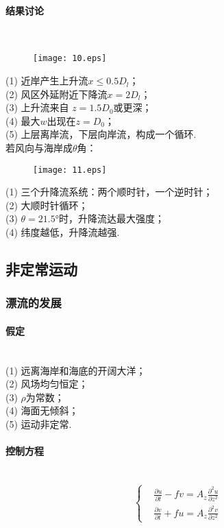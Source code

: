 \documentclass[a4paper,12pt]{article}
\begin{document}
    \paragraph{结果讨论}~{}
    \begin{figure}[H]
        \centering\texttt{[image: 10.eps]}
        \caption*{}
    \end{figure}
    (1) 近岸产生上升流$x\leq 0.5D_l$；\\
    (2) 风区外延附近下降流$x=2D_l$；\\
    (3) 上升流来自 $z=1.5D_0$或更深；\\
    (4) 最大$w$出现在$z=D_0$；\\
    (5) 上层离岸流，下层向岸流，构成一个循环.\\
    若风向与海岸成$\theta$角：\\
    \begin{figure}[H]
        \centering\texttt{[image: 11.eps]}
        \caption*{}
    \end{figure}
    (1) 三个升降流系统：两个顺时针，一个逆时针；\\
    (2) 大顺时针循环；\\
    (3) $\theta=21.5°$时，升降流达最大强度；\\
    (4) 纬度越低，升降流越强.
    \subsection{非定常运动}
    \subsubsection{漂流的发展}
    \paragraph{假定}~{} \\
    (1) 远离海岸和海底的开阔大洋；\\
    (2) 风场均匀恒定；\\
    (3) $\rho$为常数；\\
    (4) 海面无倾斜；\\
    (5) 运动非定常.\\
    \paragraph{控制方程}~{}
    \[
        \left\{
        \begin{aligned}
            &\frac{\partial u}{\partial t}-f v=A_{z} \frac{\partial^{2} u}{\partial z^{2}}\\
            &\frac{\partial v}{\partial t}+f u=A_{z} \frac{\partial^{2} v}{\partial z^{2}}
        \end{aligned}
        \right.
    \]
\end{document}

